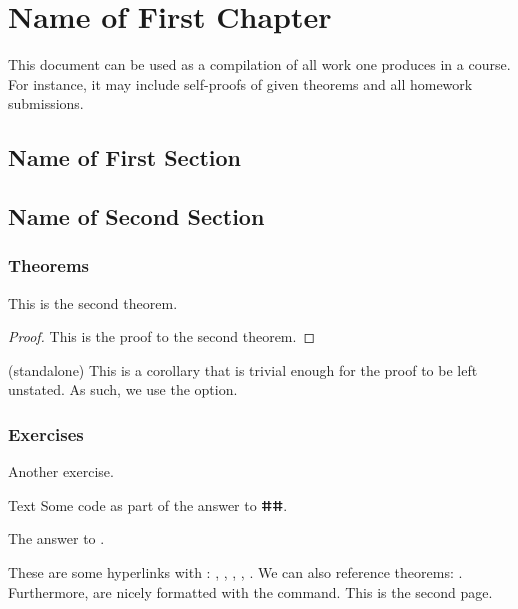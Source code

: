 \documentclass[11pt, a4paper]{book}
\begin{document}
\frontmatter
%

\thispagestyle{empty} %
%
\tableofcontents
\thispagestyle{empty}
\newpage
\setcounter{page}{1}
%
\mainmatter
\chapter{Name of First Chapter}
This document can be used as a compilation of all work one produces in a course. For instance, it may include self-proofs of given theorems and all homework submissions.
%
\section{Name of First Section}
%
\section{Name of Second Section}
\subsection{Theorems}
\begin{theorem}
    This is the second theorem.
\end{theorem}
\begin{proof}
    This is the proof to the second theorem.
\end{proof}
\begin{corollary}(standalone)
    This is a corollary that is trivial enough for the proof to be left unstated. As such, we use the  option.
\end{corollary}
\subsection{Exercises}
\begin{exercise}\label{ex:1.2}
    Another exercise.
\end{exercise}
\begin{code}{Text}
    Some code as part of the answer to ⵌⵌ.
\end{code}
\begin{answer}
    The answer to .
\end{answer}
These are some hyperlinks with : , , , , . We can also reference theorems: . Furthermore,  are nicely formatted with the  command.
\newpage
This is the second page.
\end{document}
